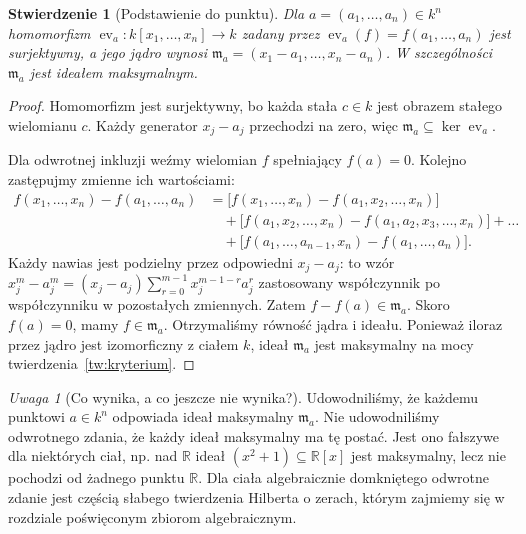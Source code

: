 \documentclass[11pt,a4paper,openany]{report}
\numberwithin{equation}{section}
\theoremstyle{plain}
\newtheorem{stwierdzenie}[twierdzenie]{Stwierdzenie}
\theoremstyle{definition}
\theoremstyle{remark}
\newtheorem{uwaga}[twierdzenie]{Uwaga}
\newcommand{\R}{\mathbb R}
\newcommand{\kerf}{\operatorname{ker}}
\newcommand{\ev}{\operatorname{ev}}
\begin{document}
\begin{stwierdzenie}[Podstawienie do punktu]
\label{st:eval-point}
Dla $a=(a_1,\dots,a_n)\in k^n$ homomorfizm
$\ev_a\colon k[x_1,\dots,x_n]\to k$ zadany przez
$\ev_a(f)=f(a_1,\dots,a_n)$ jest surjektywny, a jego jądro wynosi
$\mathfrak m_a=(x_1-a_1,\dots,x_n-a_n)$.
W szczególności $\mathfrak m_a$ jest ideałem maksymalnym.
\end{stwierdzenie}
\begin{proof}
Homomorfizm jest surjektywny, bo każda stała $c\in k$
jest obrazem stałego wielomianu $c$. Każdy generator $x_j-a_j$
przechodzi na zero, więc
$\mathfrak m_a\subseteq\kerf\ev_a$.

Dla odwrotnej inkluzji weźmy wielomian $f$ spełniający $f(a)=0$.
Kolejno zastępujmy zmienne ich wartościami:
\begin{align*}
 f(x_1,\dots,x_n)-f(a_1,\dots,a_n)
 &=\bigl[f(x_1,\dots,x_n)-f(a_1,x_2,\dots,x_n)\bigr]\\
 &\quad+\bigl[f(a_1,x_2,\dots,x_n)-f(a_1,a_2,x_3,\dots,x_n)\bigr]
 +\dots\\
 &\quad+\bigl[f(a_1,\dots,a_{n-1},x_n)-f(a_1,\dots,a_n)\bigr].
\end{align*}
Każdy nawias jest podzielny przez odpowiedni $x_j-a_j$:
to wzór $x_j^m-a_j^m=(x_j-a_j)\sum_{r=0}^{m-1}x_j^{m-1-r}a_j^r$
zastosowany współczynnik po współczynniku w pozostałych zmiennych.
Zatem $f-f(a)\in\mathfrak m_a$. Skoro $f(a)=0$,
mamy $f\in\mathfrak m_a$. Otrzymaliśmy równość jądra i ideału.
Ponieważ iloraz przez jądro jest izomorficzny z ciałem $k$,
ideał $\mathfrak m_a$ jest maksymalny na mocy
 twierdzenia~\ref{tw:kryterium}.
\end{proof}

\begin{uwaga}[Co wynika, a co jeszcze nie wynika?]
Udowodniliśmy, że każdemu punktowi $a\in k^n$ odpowiada ideał
maksymalny $\mathfrak m_a$. Nie udowodniliśmy odwrotnego zdania,
że każdy ideał maksymalny ma tę postać. Jest ono fałszywe dla
niektórych ciał, np. nad $\R$ ideał $(x^2+1)\subseteq\R[x]$
jest maksymalny, lecz nie pochodzi od żadnego punktu $\R$.
Dla ciała algebraicznie domkniętego odwrotne zdanie jest częścią
słabego twierdzenia Hilberta o zerach, którym zajmiemy się
w rozdziale poświęconym zbiorom algebraicznym.
\end{uwaga}
\end{document}
